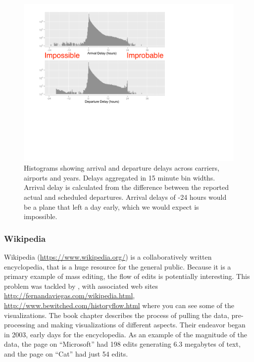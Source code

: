 \documentclass[11pt]{article}
\begin{document}
\begin{figure}[!htp]
\centerline{\includegraphics[width=5in]{images/airlines1.pdf}}
\caption{Histograms showing arrival and departure delays across carriers, airports and years. Delays aggregated in 15 minute bin widths. Arrival delay is calculated from the difference between the reported actual and scheduled departures. Arrival delays of -24 hours would be a plane that left a day early, which we would expect is impossible. }
\label{airlines1}
\end{figure}

\subsubsection{Wikipedia}

Wikipedia (\url{https://www.wikipedia.org/}) is a collaboratively written encyclopedia, that is a huge resource for the general public. Because it is a primary example of mass editing, the flow of edits is potentially interesting. This problem was tackled by \citet{wiki}, with associated web sites \url{http://fernandaviegas.com/wikipedia.html}, \url{http://www.bewitched.com/historyflow.html} where you can see some of the visualizations. The book chapter describes the process of pulling the data, pre-processing and making visualizations of different aspects. Their endeavor began in 2003, early days for the encyclopedia. As an example of the magnitude of the data, the page on ``Microsoft'' had 198 edits generating 6.3 megabytes of text, and the page on ``Cat'' had just 54 edits.
\end{document}
